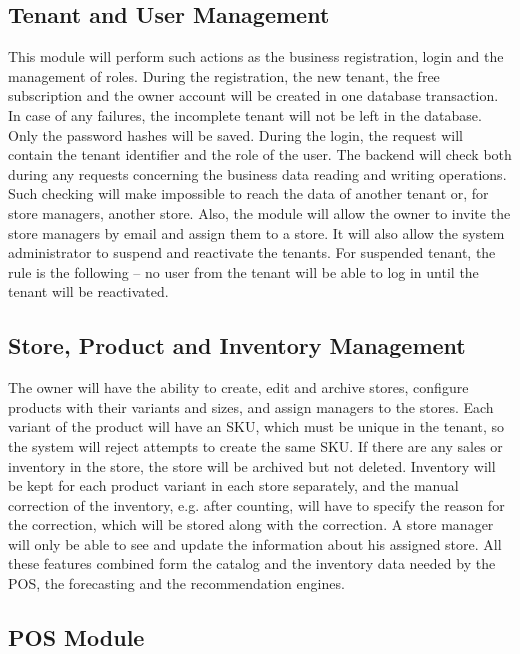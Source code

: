 \documentclass{StockSense}
\begin{document}
\subsection{Tenant and User Management}

This module will perform such actions as the business registration, login and the management of roles. During the registration, the new tenant, the free subscription and the owner account will be created in one database transaction. In case of any failures, the incomplete tenant will not be left in the database. Only the password hashes will be saved. During the login, the request will contain the tenant identifier and the role of the user. The backend will check both during any requests concerning the business data reading and writing operations. Such checking will make impossible to reach the data of another tenant or, for store managers, another store. Also, the module will allow the owner to invite the store managers by email and assign them to a store. It will also allow the system administrator to suspend and reactivate the tenants. For suspended tenant, the rule is the following – no user from the tenant will be able to log in until the tenant will be reactivated.

\subsection{Store, Product and Inventory Management}

The owner will have the ability to create, edit and archive stores, configure products with their variants and sizes, and assign managers to the stores. Each variant of the product will have an SKU, which must be unique in the tenant, so the system will reject attempts to create the same SKU. If there are any sales or inventory in the store, the store will be archived but not deleted. Inventory will be kept for each product variant in each store separately, and the manual correction of the inventory, e.g. after counting, will have to specify the reason for the correction, which will be stored along with the correction. A store manager will only be able to see and update the information about his assigned store. All these features combined form the catalog and the inventory data needed by the POS, the forecasting and the recommendation engines.

\subsection{POS Module}
\end{document}
